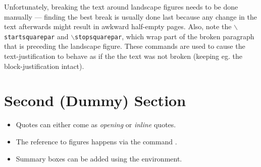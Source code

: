 \begin{multicols}{2}
Unfortunately, breaking the text around landscape figures needs to be done manually --- finding the best break is usually done last because any change in the text afterwards might result in awkward half-empty pages.
Also, note the \texttt{$\backslash$startsquarepar} and \texttt{$\backslash$stopsquarepar}, which wrap part of the broken paragraph that is preceding the landscape figure.
These commands are used to cause the text-justification to behave as if the the text was not broken (keeping eg. the block-justification intact).

\section{Second (Dummy) Section}
\textcolor{black!35}{\lipsum[1]}

\begin{tcolorbox}[arc=0pt,outer arc=0pt,breakable,title = Summary,
colback=clrt2!30,colframe=clrt2,pad at break=3mm,boxrule=1pt]
   \begin{itemize}[leftmargin=1em]
   \setlength{\itemsep}{0em}
    \item{Quotes can either come as \textit{opening} or \textit{inline} quotes.}
    \item{The reference to figures happens via the command .}
    \item{Summary boxes can be added using the  environment.}
\end{itemize}
\end{tcolorbox}

\end{multicols}
